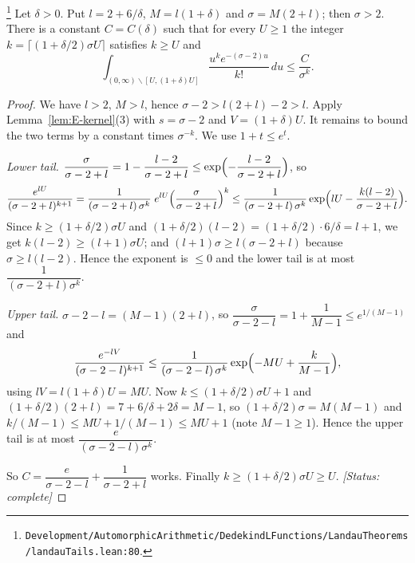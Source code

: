 \begin{lemma}\label{lem:E-tails}
\footnote{\nolinkurl{Development/AutomorphicArithmetic/DedekindLFunctions/LandauTheorems/landauTails.lean:80}.}%
Let $\delta>0$. Put $l=2+6/\delta$, $M=l(1+\delta)$ and $\sigma=M(2+l)$; then $\sigma>2$. There is a
constant $C=C(\delta)$ such that for every $U\ge1$ the integer
$k=\lceil(1+\delta/2)\sigma U\rceil$ satisfies $k\ge U$ and
\[
\int_{(0,\infty)\smallsetminus[U,(1+\delta)U]}\frac{u^{k}e^{-(\sigma-2)u}}{k!}\,du\le\frac{C}{\sigma^{k}} .
\]
\end{lemma}
\begin{proof}
We have $l>2$, $M>l$, hence $\sigma-2>l(2+l)-2>l$. Apply Lemma~\ref{lem:E-kernel}(3) with
$s=\sigma-2$ and $V=(1+\delta)U$. It remains to bound the two terms by a constant times
$\sigma^{-k}$. We use $1+t\le e^{t}$.

\emph{Lower tail.} $\dfrac{\sigma}{\sigma-2+l}=1-\dfrac{l-2}{\sigma-2+l}\le
\exp\Bigl(-\dfrac{l-2}{\sigma-2+l}\Bigr)$, so
\[
\frac{e^{lU}}{(\sigma-2+l)^{k+1}}=\frac{1}{(\sigma-2+l)\,\sigma^{k}}\;e^{lU}
\Bigl(\frac{\sigma}{\sigma-2+l}\Bigr)^{k}\le
\frac{1}{(\sigma-2+l)\,\sigma^{k}}\exp\Bigl(lU-\frac{k(l-2)}{\sigma-2+l}\Bigr).
\]
Since $k\ge(1+\delta/2)\sigma U$ and $(1+\delta/2)(l-2)=(1+\delta/2)\cdot6/\delta=l+1$, we get
$k(l-2)\ge(l+1)\sigma U$; and $(l+1)\sigma\ge l(\sigma-2+l)$ because $\sigma\ge l(l-2)$. Hence the
exponent is $\le0$ and the lower tail is at most $\dfrac{1}{(\sigma-2+l)\sigma^{k}}$.

\emph{Upper tail.} $\sigma-2-l=(M-1)(2+l)$, so
$\dfrac{\sigma}{\sigma-2-l}=1+\dfrac{1}{M-1}\le e^{1/(M-1)}$ and
\[
\frac{e^{-lV}}{(\sigma-2-l)^{k+1}}\le\frac{1}{(\sigma-2-l)\,\sigma^{k}}
\exp\Bigl(-MU+\frac{k}{M-1}\Bigr),
\]
using $lV=l(1+\delta)U=MU$. Now $k\le(1+\delta/2)\sigma U+1$ and
$(1+\delta/2)(2+l)=7+6/\delta+2\delta=M-1$, so $(1+\delta/2)\sigma=M(M-1)$ and
$k/(M-1)\le MU+1/(M-1)\le MU+1$ (note $M-1\ge1$). Hence the upper tail is at most
$\dfrac{e}{(\sigma-2-l)\sigma^{k}}$.

So $C=\dfrac{e}{\sigma-2-l}+\dfrac{1}{\sigma-2+l}$ works. Finally
$k\ge(1+\delta/2)\sigma U\ge U$.
\textit{[Status: complete]}
\end{proof}


